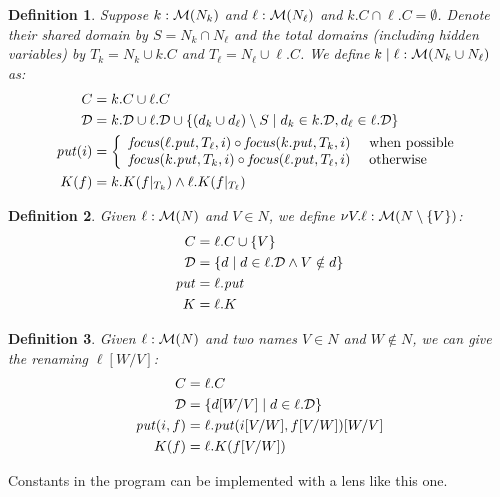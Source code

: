 \documentclass{article}
\newtheorem{definition}{Definition}
\begin{document}
\begin{definition}
    Suppose $k : \mathcal M(N_k)$ and $\ell : \mathcal M(N_\ell)$ and $k.C \cap
    \ell.C = \emptyset$. Denote their shared domain by $S=N_k \cap N_\ell$
    and the total domains (including hidden variables) by $T_k=N_k \cup k.C$
    and $T_\ell=N_\ell \cup \ell.C$. We define $k\mid\ell : \mathcal M(N_k \cup
    N_\ell)$ as:
    \begin{align*}
        C &= k.C \cup \ell.C \\
        \mathcal D &= k.\mathcal D \cup \ell.\mathcal D \cup
            \{(d_k \cup d_\ell) \setminus S
            \mid d_k \in k.\mathcal D, d_\ell \in \ell.\mathcal D\} \\
        \mathit{put}(i) &= \left\{\begin{array}{ll}
            \mathit{focus}(\ell.\mathit{put},T_\ell,i) \circ \mathit{focus}(k.\mathit{put},T_k,i)
                & \mbox{ when possible} \\
            \mathit{focus}(k.\mathit{put},T_k,i) \circ \mathit{focus}(\ell.\mathit{put},T_\ell,i)
                & \mbox{ otherwise}
            \end{array}\right. \\
        K(f) &= k.K(f|_{T_k}) \land \ell.K(f|_{T_\ell})
    \end{align*}
\end{definition}

\begin{definition}
    Given $\ell : \mathcal M(N)$ and $V \in N$, we define $\nu V.\ell : \mathcal M(N
    \setminus \{V\})$:
    \begin{align*}
        C &= \ell.C \cup \{V\} \\
        \mathcal D &= \{d \mid d \in \ell.\mathcal D \land V \notin d\} \\
        \mathit{put} &= \ell.\mathit{put} \\
        K &= \ell.K
    \end{align*}
\end{definition}

\begin{definition}
    Given $\ell : \mathcal M(N)$ and two names $V \in N$ and $W \notin N$, we can
    give the renaming $\ell[W/V]$:
    \begin{align*}
        C &= \ell.C \\
        \mathcal D &= \{d[W/V] \mid d \in \ell.\mathcal D\} \\
        \mathit{put}(i,f) &= \ell.\mathit{put}(i[V/W], f[V/W])[W/V] \\
        K(f) &= \ell.K(f[V/W])
    \end{align*}
\end{definition}

Constants in the program can be implemented with a lens like this one.
\end{document}
